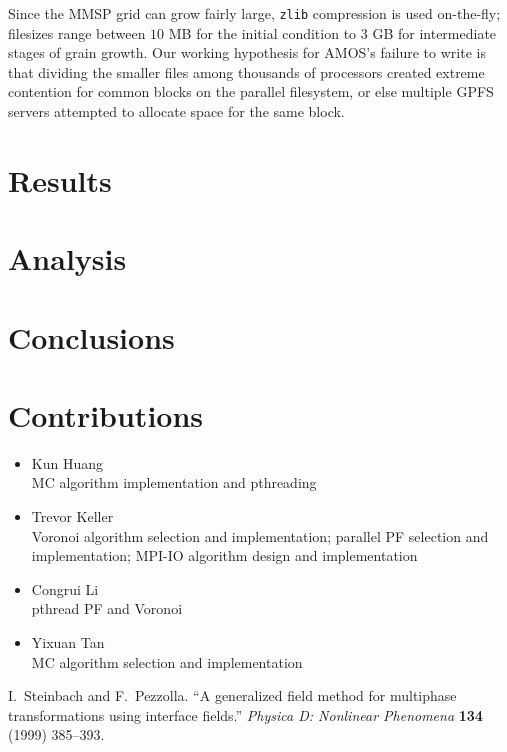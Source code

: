 \documentclass[11pt]{article}
\begin{document}
\begin{multicols*}{2}
Since the MMSP grid can grow fairly large, \texttt{zlib} compression is used on-the-fly;
filesizes range between $10$ MB for the initial condition to $3$ GB for intermediate stages of grain growth.
Our working hypothesis for AMOS's failure to write is that dividing the smaller files among thousands of processors created extreme contention for common blocks on the parallel filesystem, or else multiple GPFS servers attempted to allocate space for the same block.




\section{Results}


\section{Analysis}


\section{Conclusions}


\section{Contributions}
\begin{itemize}
 \item Kun Huang\\
	MC algorithm implementation and pthreading
 \item Trevor Keller\\
	Voronoi algorithm selection and implementation; parallel PF selection and implementation; MPI-IO algorithm design and implementation
 \item Congrui Li\\
	pthread PF and Voronoi
 \item Yixuan Tan\\
	MC algorithm selection and implementation
\end{itemize}

\label{LastPage}
\begin{footnotesize}
\begin{thebibliography}{1}
   I.~Steinbach and F.~Pezzolla. ``A generalized field method for multiphase transformations using interface fields.'' \emph{Physica D: Nonlinear Phenomena} \textbf{134} (1999) 385--393.
\end{thebibliography}
\end{footnotesize}
\end{multicols*}
\end{document}
